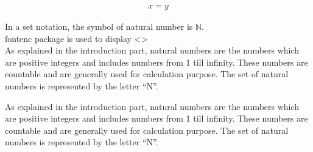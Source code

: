 \documentclass{article}
\begin{document}
\begin{align}
    x=y
\end{align}

In a set notation, the symbol of natural number is $\mathbb{N}$.\\
fontenc package is used to display <> \\

\singlespacing
As explained in the introduction part, 
natural numbers are the numbers which are 
positive integers and includes numbers from 1 
till infinity. These numbers are countable 
and are generally used for calculation purpose.  
The set of natural numbers is represented 
by the letter “N”.

\doublespacing
As explained in the introduction part, 
natural numbers are the numbers which are 
positive integers and includes numbers from 1 
till infinity. These numbers are countable 
and are generally used for calculation purpose.  
The set of natural numbers is represented 
by the letter “N”.
\end{document}
